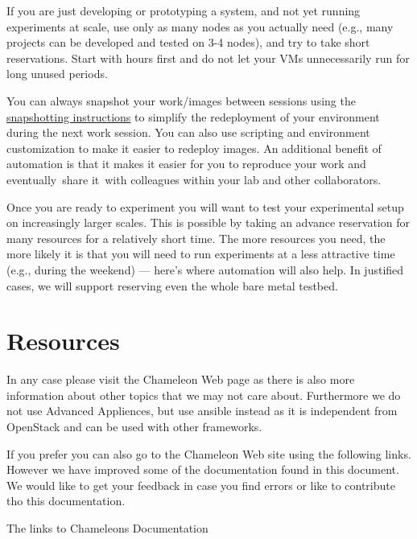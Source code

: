 \begin{description}
\item
  \item[Think Small for Development and class use:] If you are just developing or
  prototyping a system, and not yet running experiments at scale, use
  only as many nodes as you actually need (e.g., many projects can be
  developed and tested on 3-4 nodes), and try to take short
  reservations. Start with hours first and do not let your VMs
  unnecessarily run for long unused periods. 
\item
  \item[Automate deployments:] You can always snapshot your work/images
  between sessions using the
  \href{https://www.chameleoncloud.org/docs/user-guides/ironic/\#snapshotting_an_instance}{snapshotting
  instructions} to simplify the redeployment of your environment during
  the next work session. You can also use scripting and environment
  customization to make it easier to redeploy images. An additional
  benefit of automation is that it makes it easier for you to reproduce
  your work and eventually~share it~with colleagues within your lab and
  other collaborators.
\item [Think Big for Experimentation:] Once you are ready to experiment you
  will want to test your experimental setup on increasingly larger
  scales. This is possible by taking an advance reservation for many
  resources for a relatively short time. The more resources you need,
  the more likely it is that you will need to run experiments at a less
  attractive time (e.g., during the weekend) --- here's where automation
  will also help. In justified cases, we will support reserving even the
  whole bare metal testbed.
\end{description}

\section{Resources}

In any case please visit the Chameleon Web page as there is also more
information about other topics that we may not care about. Furthermore
we do not use Advanced Appliences, but use ansible instead as it is
independent from OpenStack and can be used with other frameworks.

If you prefer you can also go to the Chameleon Web site using the
following links. However we have improved some of the documentation
found in this document. We would like to get your feedback in case you
find errors or like to contribute tho this documentation.

The links to Chameleons Documentation 












%